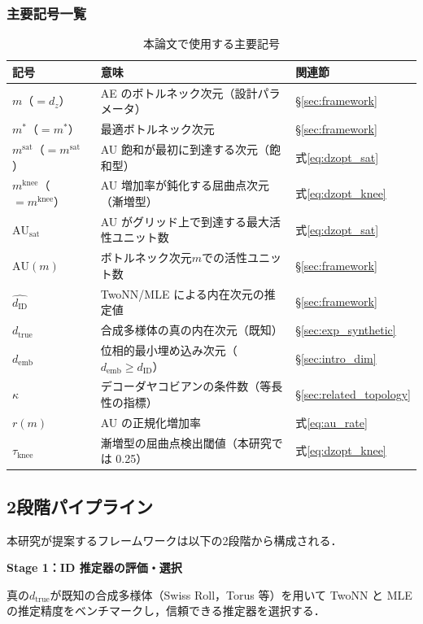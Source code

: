 \documentclass[12pt,a4paper]{jsarticle}
\newcommand{\dID}{d_{\mathrm{ID}}}
\newcommand{\dzopt}{m^*}                    %
\newcommand{\dtrue}{d_{\mathrm{true}}}
\newcommand{\kap}{\kappa}
\newcommand{\AUsat}{\mathrm{AU}_{\mathrm{sat}}}
\newcommand{\dzsat}{m^{\mathrm{sat}}}       %
\newcommand{\mknee}{m^{\mathrm{knee}}}      %
\newcommand{\demb}{d_{\mathrm{emb}}}
\begin{document}
\subsubsection*{主要記号一覧}
\begin{table}[H]
\centering
\caption{本論文で使用する主要記号}
\label{tab:notation}
\small
\begin{tabular}{lll}
\toprule
記号 & 意味 & 関連節 \\
\midrule
$m$（$= d_z$） & AE のボトルネック次元（設計パラメータ） & §\ref{sec:framework} \\
$\dzopt$（$= m^*$） & 最適ボトルネック次元 & §\ref{sec:framework} \\
$\dzsat$（$= m^{\mathrm{sat}}$） & AU 飽和が最初に到達する次元（飽和型） & 式\eqref{eq:dzopt_sat} \\
$\mknee$（$= m^{\mathrm{knee}}$） & AU 増加率が鈍化する屈曲点次元（漸増型） & 式\eqref{eq:dzopt_knee} \\
$\AUsat$ & AU がグリッド上で到達する最大活性ユニット数 & 式\eqref{eq:dzopt_sat} \\
$\mathrm{AU}(m)$ & ボトルネック次元$m$での活性ユニット数 & §\ref{sec:framework} \\
$\hat{\dID}$ & TwoNN/MLE による内在次元の推定値 & §\ref{sec:framework} \\
$\dtrue$ & 合成多様体の真の内在次元（既知） & §\ref{sec:exp_synthetic} \\
$\demb$ & 位相的最小埋め込み次元（$\demb \geq \dID$） & §\ref{sec:intro_dim} \\
$\kap$ & デコーダヤコビアンの条件数（等長性の指標） & §\ref{sec:related_topology} \\
$r(m)$ & AU の正規化増加率 & 式\eqref{eq:au_rate} \\
$\tau_{\mathrm{knee}}$ & 漸増型の屈曲点検出閾値（本研究では 0.25） & 式\eqref{eq:dzopt_knee} \\
\bottomrule
\end{tabular}
\end{table}

\subsection{2段階パイプライン}

本研究が提案するフレームワークは以下の2段階から構成される．

\textbf{Stage 1：ID 推定器の評価・選択}

真の$\dtrue$が既知の合成多様体（Swiss Roll，Torus 等）を用いて
TwoNN と MLE の推定精度をベンチマークし，信頼できる推定器を選択する．
\end{document}
